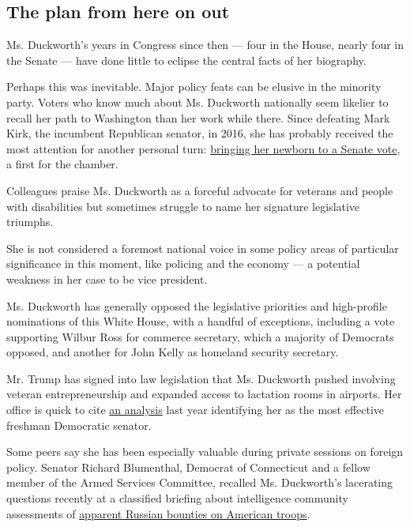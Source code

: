 \hypertarget{the-plan-from-here-on-out}{%
\subsection{The plan from here on out}\label{the-plan-from-here-on-out}}

Ms. Duckworth's years in Congress since then --- four in the House,
nearly four in the Senate --- have done little to eclipse the central
facts of her biography.

Perhaps this was inevitable. Major policy feats can be elusive in the
minority party. Voters who know much about Ms. Duckworth nationally seem
likelier to recall her path to Washington than her work while there.
Since defeating Mark Kirk, the incumbent Republican senator, in 2016,
she has probably received the most attention for another personal turn:
\href{https://www.nytimes3xbfgragh.onion/2018/04/19/us/politics/baby-duckworth-senate-floor.html}{bringing
her newborn to a Senate vote}, a first for the chamber.

Colleagues praise Ms. Duckworth as a forceful advocate for veterans and
people with disabilities but sometimes struggle to name her signature
legislative triumphs.

She is not considered a foremost national voice in some policy areas of
particular significance in this moment, like policing and the economy
--- a potential weakness in her case to be vice president.

Ms. Duckworth has generally opposed the legislative priorities and
high-profile nominations of this White House, with a handful of
exceptions, including a vote supporting Wilbur Ross for commerce
secretary, which a majority of Democrats opposed, and another for John
Kelly as homeland security secretary.

Mr. Trump has signed into law legislation that Ms. Duckworth pushed
involving veteran entrepreneurship and expanded access to lactation
rooms in airports. Her office is quick to cite
\href{https://news.vanderbilt.edu/2019/02/28/grassley-klobuchar-most-effective-senators-of-115th-congress-according-to-study/}{an
analysis} last year identifying her as the most effective freshman
Democratic senator.

Some peers say she has been especially valuable during private sessions
on foreign policy. Senator Richard Blumenthal, Democrat of Connecticut
and a fellow member of the Armed Services Committee, recalled Ms.
Duckworth's lacerating questions recently at a classified briefing about
intelligence community assessments of
\href{https://www.nytimes3xbfgragh.onion/2020/06/26/us/politics/russia-afghanistan-bounties.html}{apparent
Russian bounties on American troops}.

